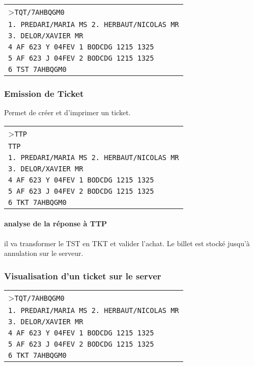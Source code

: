 \documentclass[a4paper,11pt]{article}
\begin{document}
\begin{centering}
\begin{tabular}{|p{\linewidth}|}
 \hline
>\texttt{TQT/7AHBQGM0} \\	
\texttt{1. PREDARI/MARIA MS  2. HERBAUT/NICOLAS MR}\\
\texttt{3. DELOR/XAVIER MR}\\
\texttt{4 AF 623 Y 04FEV 1 BODCDG 1215 1325}\\
\texttt{5 AF 623 J 04FEV 2 BODCDG 1215 1325}\\
\texttt{6 TST 7AHBQGM0}\\

   \end{tabular}
\end{centering} 

\subsubsection*{Emission de Ticket}
Permet de créer et d'imprimer un ticket.

\begin{centering}
\begin{tabular}{|p{\linewidth}|}
 \hline
>\texttt{TTP} \\	
\texttt{TTP} \\	
\texttt{1. PREDARI/MARIA MS  2. HERBAUT/NICOLAS MR}\\
\texttt{3. DELOR/XAVIER MR}\\
\texttt{4 AF 623 Y 04FEV 1 BODCDG 1215 1325}\\
\texttt{5 AF 623 J 04FEV 2 BODCDG 1215 1325}\\
\texttt{6 TKT 7AHBQGM0}\\

   \end{tabular}
\end{centering} 

\paragraph{analyse de la réponse à TTP}

il va transformer le TST en TKT et valider l'achat. Le billet est stocké jusqu'à annulation sur le serveur.

\subsubsection*{Visualisation d'un ticket sur le server}


\begin{centering}
\begin{tabular}{|p{\linewidth}|}
 \hline
>\texttt{TQT/7AHBQGM0} \\	
\texttt{1. PREDARI/MARIA MS  2. HERBAUT/NICOLAS MR}\\
\texttt{3. DELOR/XAVIER MR}\\
\texttt{4 AF 623 Y 04FEV 1 BODCDG 1215 1325}\\
\texttt{5 AF 623 J 04FEV 2 BODCDG 1215 1325}\\
\texttt{6 TKT 7AHBQGM0}\\

   \end{tabular}
\end{centering} 
\end{document}
